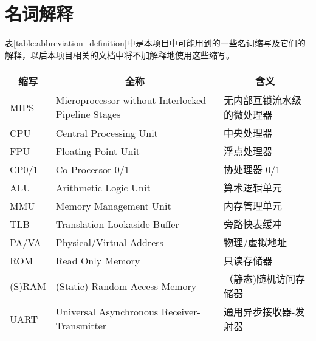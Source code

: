 \section{名词解释}

表\ref{table:abbreviation_definition}中是本项目中可能用到的一些名词缩写及它们的解释，以后本项目相关的文档中将不加解释地使用这些缩写。

\begin{table}[!htbp]
    \centering
    \begin{tabular}{|l|l|l|}
    \hline
    \multicolumn{1}{|c|}{\textbf{缩写}} & \multicolumn{1}{c|}{\textbf{全称}}                   & \multicolumn{1}{c|}{\textbf{含义}} \\ \hline
    MIPS                              & Microprocessor without Interlocked Pipeline Stages & 无内部互锁流水级的微处理器                    \\ \hline
    CPU                               & Central Processing Unit                            & 中央处理器                            \\ \hline
    FPU                               & Floating Point Unit                                & 浮点处理器                            \\ \hline
    CP0/1                             & Co-Processor 0/1                                   & 协处理器 0/1                         \\ \hline
    ALU                               & Arithmetic Logic Unit                              & 算术逻辑单元                           \\ \hline
    MMU                               & Memory Management Unit                             & 内存管理单元                           \\ \hline
    TLB                               & Translation Lookaside Buffer                       & 旁路快表缓冲                           \\ \hline
    PA/VA                             & Physical/Virtual Address                           & 物理/虚拟地址                          \\ \hline
    ROM                               & Read Only Memory                                   & 只读存储器                            \\ \hline
    (S)RAM                            & (Static) Random Access Memory                      & （静态)随机访问存储器                      \\ \hline
    UART                              & Universal Asynchronous Receiver-Transmitter        & 通用异步接收器-发射器                      \\ \hline

\end{tabular}
\end{table}

